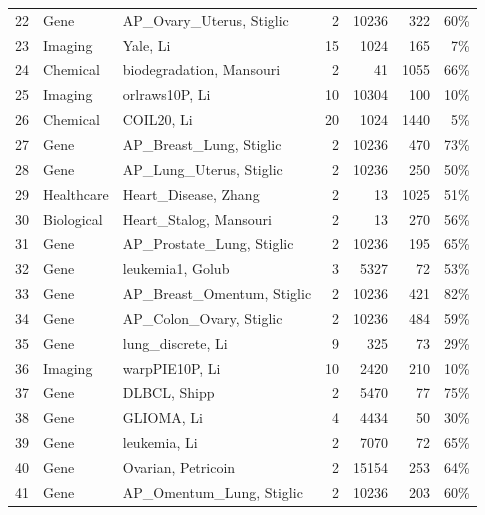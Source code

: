 \documentclass[preprint,12pt,authoryear]{elsarticle}
\begin{document}
{\begin{longtable}{@{}r p{1.9cm} p{6.7cm} r r r r@{}}
22 & Gene & AP\_Ovary\_Uterus, Stiglic \citeyearpar{stiglic2010stability} & 2 & 10236 & 322 & 60\% \\
23 & Imaging & Yale, Li \citeyearpar{li2017feature} & 15 & 1024 & 165 & 7\% \\
24 & Chemical & biodegradation, Mansouri \citeyearpar{mansouri2013quantitative} & 2 & 41 & 1055 & 66\% \\
25 & Imaging & orlraws10P, Li \citeyearpar{li2017feature} & 10 & 10304 & 100 & 10\% \\
26 & Chemical & COIL20, Li \citeyearpar{li2017feature} & 20 & 1024 & 1440 & 5\% \\
27 & Gene & AP\_Breast\_Lung, Stiglic \citeyearpar{stiglic2010stability} & 2 & 10236 & 470 & 73\% \\
28 & Gene & AP\_Lung\_Uterus, Stiglic \citeyearpar{stiglic2010stability} & 2 & 10236 & 250 & 50\% \\
29 & Healthcare & Heart\_Disease, Zhang \citeyearpar{zhang2018integrating} & 2 & 13 & 1025 & 51\% \\
30 & Biological & Heart\_Stalog, Mansouri \citeyearpar{statlog_heart_145} & 2 & 13 & 270 & 56\% \\
31 & Gene & AP\_Prostate\_Lung, Stiglic \citeyearpar{stiglic2010stability} & 2 & 10236 & 195 & 65\% \\
32 & Gene & leukemia1, Golub \citeyearpar{golub1999molecular} & 3 & 5327 & 72 & 53\% \\
33 & Gene & AP\_Breast\_Omentum, Stiglic \citeyearpar{stiglic2010stability} & 2 & 10236 & 421 & 82\% \\
34 & Gene & AP\_Colon\_Ovary, Stiglic \citeyearpar{stiglic2010stability} & 2 & 10236 & 484 & 59\% \\
35 & Gene & lung\_discrete, Li \citeyearpar{li2017feature} & 9 & 325 & 73 & 29\% \\
36 & Imaging & warpPIE10P, Li \citeyearpar{li2017feature} & 10 & 2420 & 210 & 10\% \\
37 & Gene & DLBCL, Shipp \citeyearpar{shipp2002diffuse} & 2 & 5470 & 77 & 75\% \\
38 & Gene & GLIOMA, Li \citeyearpar{li2017feature} & 4 & 4434 & 50 & 30\% \\
39 & Gene & leukemia, Li \citeyearpar{li2017feature} & 2 & 7070 & 72 & 65\% \\
40 & Gene & Ovarian, Petricoin \citeyearpar{petricoin2002use} & 2 & 15154 & 253 & 64\% \\
41 & Gene & AP\_Omentum\_Lung, Stiglic \citeyearpar{stiglic2010stability} & 2 & 10236 & 203 & 60\% \\

\end{longtable}}
\end{document}
